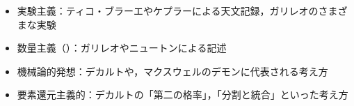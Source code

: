 \begin{itemize}
	\item 実験主義：ティコ・ブラーエやケプラーによる天文記録，ガリレオのさまざまな実験
	\item 数量主義（）：ガリレオやニュートンによる記述
	\item 機械論的発想：デカルトや，マクスウェルのデモンに代表される考え方
	\item 要素還元主義的：デカルトの「第二の格率」，「分割と統合」といった考え方
\end{itemize}
